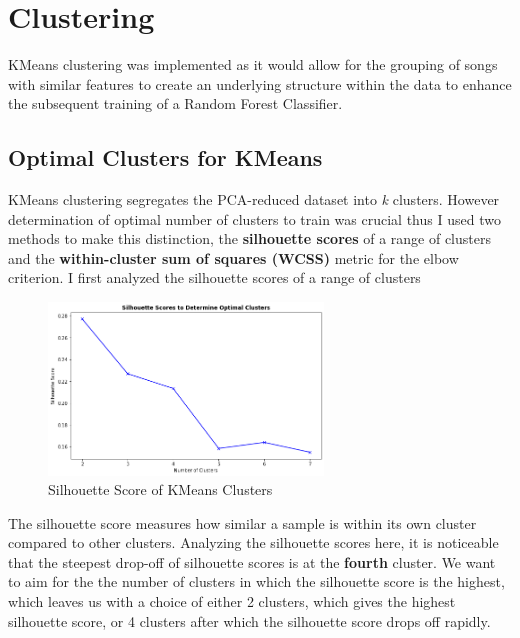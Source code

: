 \documentclass[12pt]{article}
\begin{document}
\section*{\textbf{Clustering}}
KMeans clustering was implemented as it would allow for the grouping of songs with similar features to create an underlying structure within the data to enhance the subsequent training of a Random Forest Classifier.

\subsection*{\textbf{Optimal Clusters for KMeans}}
KMeans clustering segregates the PCA-reduced dataset into \textit{k} clusters. However determination of optimal number of clusters to train was crucial thus I used two methods to make this distinction, the \textbf{silhouette scores} of a range of clusters and the \textbf{within-cluster sum of squares (WCSS)} metric for the elbow criterion. I first analyzed the silhouette scores of a range of clusters


\begin{figure}[htbp]
  \centering
  \vspace{-0.075cm}
  \includegraphics[width=0.65\textwidth]{kmeans_silhouette.png}
  \caption{Silhouette Score of KMeans Clusters}
  \label{KMeans Silhouette Scores}
\end{figure}


\noindent
The silhouette score measures how similar a sample is within its own cluster compared to other clusters. Analyzing the silhouette scores here, it is noticeable that the steepest drop-off of silhouette scores is at the \textbf{fourth} cluster. We want to aim for the the number of clusters in which the silhouette score is the highest, which leaves us with a choice of either 2 clusters, which gives the highest silhouette score, or 4 clusters after which the silhouette score drops off rapidly. \\ 
\end{document}
